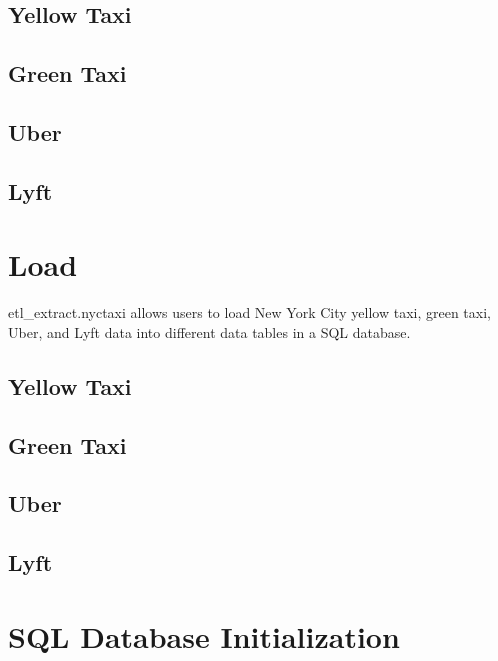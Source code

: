 \documentclass[12pt,twoside]{reedthesis}
\theoremstyle{definition}
\theoremstyle{definition}
\theoremstyle{definition}
\theoremstyle{remark}
\begin{document}
\subsection{Yellow Taxi}\label{yellow-taxi-3}

\subsection{Green Taxi}\label{green-taxi-3}

\subsection{Uber}\label{uber-3}

\subsection{Lyft}\label{lyft-3}

\section{Load}\label{load}

etl\_extract.nyctaxi allows users to load New York City yellow taxi,
green taxi, Uber, and Lyft data into different data tables in a SQL
database.

\subsection{Yellow Taxi}\label{yellow-taxi-4}

\subsection{Green Taxi}\label{green-taxi-4}

\subsection{Uber}\label{uber-4}

\subsection{Lyft}\label{lyft-4}

\section{SQL Database Initialization}\label{sql-database-initialization}
\end{document}
